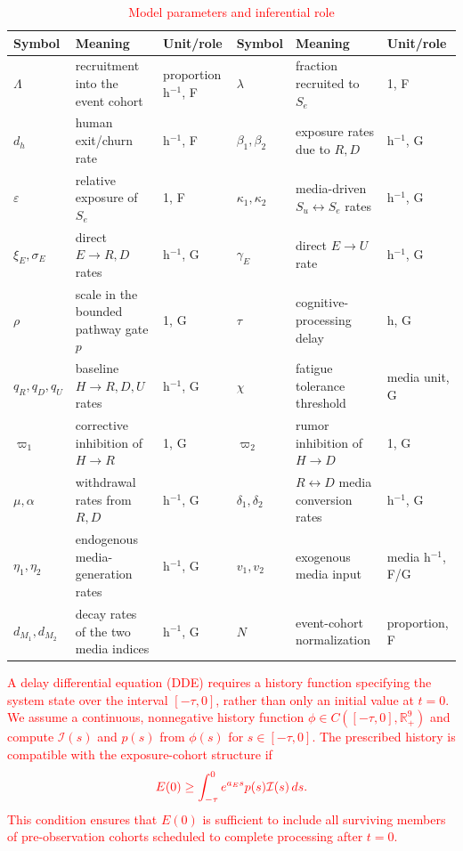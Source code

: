 \documentclass[letterpaper,journal]{IEEEtran}
\begin{document}
	\begin{table}[t]
		\caption{\textcolor{red}{Model parameters and inferential role}}
		\label{tab:parameters}
		\centering\scriptsize
		\begin{tabularx}{\textwidth}{@{}lXllXl@{}}
		\toprule
		Symbol & Meaning & Unit/role & Symbol & Meaning & Unit/role\\
		\midrule
		$\Lambda$ & recruitment into the event cohort & proportion h$^{-1}$, F & $\lambda$ & fraction recruited to $S_e$ & 1, F\\
		$d_h$ & human exit/churn rate & h$^{-1}$, F & $\beta_1,\beta_2$ & exposure rates due to $R,D$ & h$^{-1}$, G\\
		$\varepsilon$ & relative exposure of $S_e$ & 1, F & $\kappa_1,\kappa_2$ & media-driven $S_u\leftrightarrow S_e$ rates & h$^{-1}$, G\\
		$\xi_E,\sigma_E$ & direct $E\to R,D$ rates & h$^{-1}$, G & $\gamma_E$ & direct $E\to U$ rate & h$^{-1}$, G\\
		$\rho$ & scale in the bounded pathway gate $p$ & 1, G & $\tau$ & cognitive-processing delay & h, G\\
		$q_R,q_D,q_U$ & baseline $H\to R,D,U$ rates & h$^{-1}$, G & $\chi$ & fatigue tolerance threshold & media unit, G\\
		$\varpi_1$ & corrective inhibition of $H\to R$ & 1, G & $\varpi_2$ & rumor inhibition of $H\to D$ & 1, G\\
		$\mu,\alpha$ & withdrawal rates from $R,D$ & h$^{-1}$, G & $\delta_1,\delta_2$ & $R\leftrightarrow D$ media conversion rates & h$^{-1}$, G\\
		$\eta_1,\eta_2$ & endogenous media-generation rates & h$^{-1}$, G & $v_1,v_2$ & exogenous media input & media h$^{-1}$, F/G\\
		$d_{M_1},d_{M_2}$ & decay rates of the two media indices & h$^{-1}$, G & $N$ & event-cohort normalization & proportion, F\\
		\bottomrule
		\end{tabularx}
	\end{table}

	\textcolor{red}{A delay differential equation (DDE) requires a history function specifying the system state over the interval $[-\tau,0]$, rather than only an initial value at $t=0$. We assume a continuous, nonnegative history function $\phi\in C([-\tau,0],\mathbb R_+^9)$ and compute $\mathcal I(s)$ and $p(s)$ from $\phi(s)$ for $s\in[-\tau,0]$. The prescribed history is compatible with the exposure-cohort structure if}
	\begin{equation}
		\textcolor{red}{
		E(0)\geq\int_{-\tau}^{0}e^{a_Es}p(s)\mathcal I(s)\,ds.
		\label{sys:init}}
	\end{equation}
	\textcolor{red}{
	This condition ensures that $E(0)$ is sufficient to include all surviving members of pre-observation cohorts scheduled to complete processing after $t=0$.
	}
	
\end{document}
